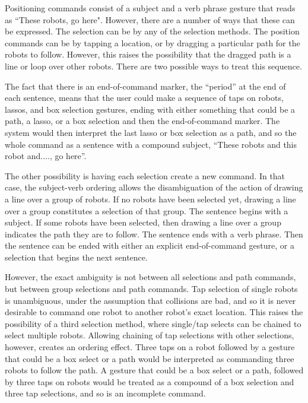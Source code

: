 Positioning commands consist of a subject and a verb phrase gesture that reads as ``These robots, go here". 
However, there are a number of ways that these can be expressed. 
The selection can be by any of the selection methods. 
The position commands can be by tapping a location, or by dragging a particular path for the robots to follow. 
However, this raises the possibility that the dragged path is a line or loop over other robots. 
There are two possible ways to treat this sequence. 

The fact that there is an end-of-command marker, the ``period'' at the end of each sentence, means that the user could make a sequence of taps on robots, lassos, and box selection gestures, ending with either something that could be a path, a lasso, or a box selection and then the end-of-command marker. 
The system would then interpret the last lasso or box selection as a path, and so the whole command as a sentence with a compound subject, ``These robots and this robot and...., go here''. 

The other possibility is having each selection create a new command. 
In that case, the subject-verb ordering allows the disambiguation of the action of drawing a line over a group of robots. 
If no robots have been selected yet, drawing a line over a group constitutes a selection of that group. 
The sentence begins with a subject. 
If some robots have been selected, then drawing a line over a group indicates the path they are to follow. 
The sentence ends with a verb phrase. 
Then the sentence can be ended with either an explicit end-of-command gesture, or a selection that begins the next sentence. 

However, the exact ambiguity is not between all selections and path commands, but between group selections and path commands.
Tap selection of single robots is unambiguous, under the assumption that collisions are bad, and so it is never desirable to command one robot to another robot's exact location. 
This raises the possibility of a third selection method, where single/tap selects can be chained to select multiple robots. 
Allowing chaining of tap selections with other selections, however, creates an ordering effect. 
Three taps on a robot followed by a gesture that could be a box select or a path would be interpreted as commanding three robots to follow the path. 
A gesture that could be a box select or a path, followed by three taps on robots would be treated as a compound of a box selection and three tap selections, and so is an incomplete command. 

